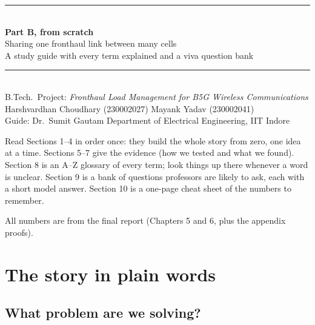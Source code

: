 \documentclass[11pt,a4paper]{article}
\begin{document}
\begin{titlepage}
\centering
\vspace*{2.5cm}
{\color{iitblue}\rule{\linewidth}{1.2pt}}\\[10pt]
{\Huge\bfseries\color{iitblue} Part B, from scratch}\\[8pt]
{\Large Sharing one fronthaul link between many cells}\\[6pt]
{\large A study guide with every term explained and a viva question bank}\\[10pt]
{\color{iitblue}\rule{\linewidth}{1.2pt}}\\[1.5cm]
{\large B.Tech.\ Project: \emph{Fronthaul Load Management for B5G Wireless Communications}}\\[6pt]
Harshvardhan Choudhary (230002027) \quad Mayank Yadav (230002041)\\[3pt]
Guide: Dr.\ Sumit Gautam \quad Department of Electrical Engineering, IIT Indore\\[2cm]
\begin{minipage}{0.82\linewidth}
\begin{idea}
Read Sections 1--4 in order once: they build the whole story from zero, one idea at a time. Sections 5--7 give the evidence (how we tested and what we found). Section 8 is an A--Z glossary of every term; look things up there whenever a word is unclear. Section 9 is a bank of questions professors are likely to ask, each with a short model answer. Section 10 is a one-page cheat sheet of the numbers to remember.

All numbers are from the final report (Chapters 5 and 6, plus the appendix proofs).
\end{idea}
\end{minipage}
\vfill
\end{titlepage}

\tableofcontents
\newpage

\section{The story in plain words}

\subsection{What problem are we solving?}
\end{document}
